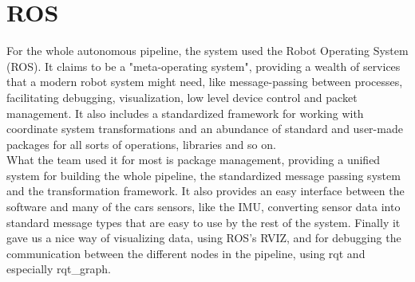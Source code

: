 \section{ROS}

For the whole autonomous pipeline, the system used the Robot Operating System (ROS)\cite{ROS}. It claims to be a "meta-operating system", providing a wealth of services that a modern robot system might need, like message-passing between processes, facilitating debugging, visualization, low level device control and packet management. It also includes a standardized framework for working with coordinate system transformations and an abundance of standard and user-made packages for all sorts of operations, libraries and so on. \\

What the team used it for most is package management, providing a unified system for building the whole pipeline, the standardized message passing system and the transformation framework. It also provides an easy interface between the software and many of the cars sensors, like the IMU, converting sensor data into standard message types that are easy to use by the rest of the system. Finally it gave us a nice way of visualizing data, using ROS's RVIZ, and for debugging the communication between the different nodes in the pipeline, using rqt and especially rqt\_graph.